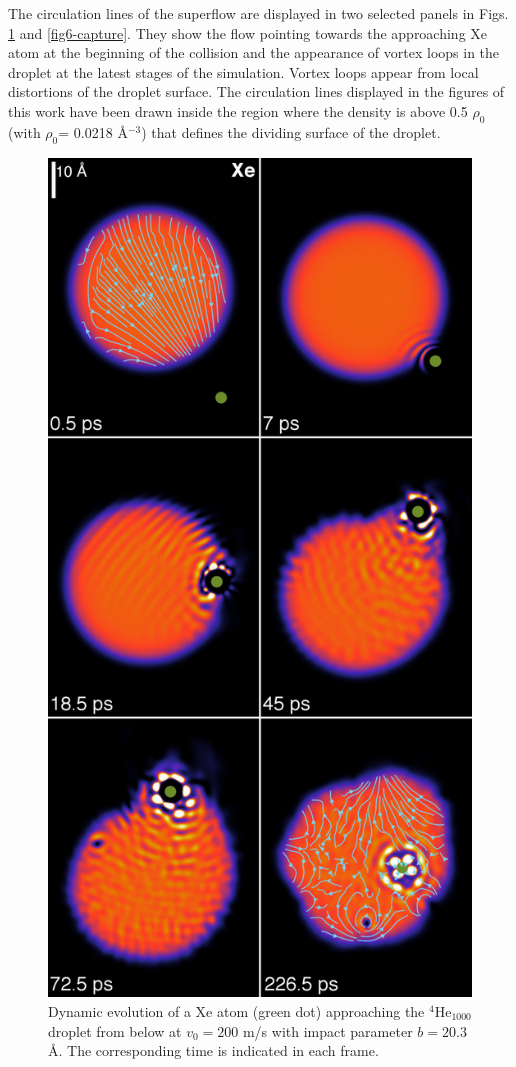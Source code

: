  The circulation lines of the superflow are displayed 
in two selected panels in Figs. \ref{fig5-capture} and \ref{fig6-capture}. 
They show the flow  pointing towards
the approaching Xe atom at the beginning of the collision and the appearance of vortex loops  
in the droplet at the latest stages of the simulation.
Vortex loops appear  from local distortions of the droplet surface.\citep{Lea14b} 
The circulation lines  displayed  in the figures of this work have been drawn inside the region where the density is above  0.5 $\rho_0$ (with $\rho_0$= 0.0218 \AA$^{-3}$)
 that defines the dividing surface of the droplet. 

\begin{figure}[h]
\centerline{\includegraphics[width=0.60\linewidth,clip]{xehe200-b203-composed}}
\caption{\label{fig5-capture} 
Dynamic evolution of a Xe atom (green dot) approaching the $^4$He$_{1000}$ 
droplet from below at $v_0 = 200$ m/s with impact parameter $b = 20.3$ \AA{}. The corresponding time is indicated in each frame.\citep{ESI} 
}
\end{figure}
%

